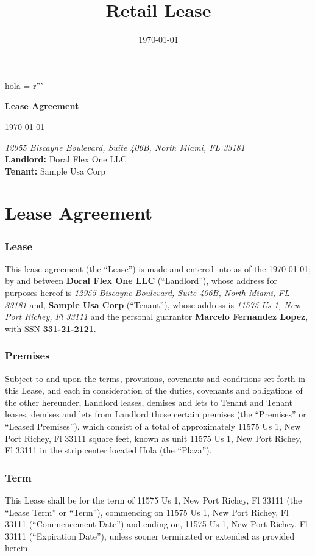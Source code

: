 hola = r'''\documentclass{article}
\title{Retail Lease}
\date{\today}
\newcommand{\docname}{Lease Agreement}
\newcommand{\company}{Doral Flex One LLC}
\newcommand{\buildingaddress}{Hola}
\newcommand{\tenant}{Sample Usa Corp}
\newcommand{\tenantaddress}{11575 Us 1, New Port Richey, Fl 33111}
\newcommand{\corpaddress}{12955 Biscayne Boulevard, Suite 406B, North Miami, FL 33181}
\newcommand{\tenantpersonalguarantor}{Marcelo Fernandez Lopez}
\newcommand{\guarantorssn}{331-21-2121}
\newcommand{\unit}{11575 Us 1, New Port Richey, Fl 33111}
\newcommand{\unitsize}{11575 Us 1, New Port Richey, Fl 33111}
\newcommand{\leaseterm}{11575 Us 1, New Port Richey, Fl 33111}
\newcommand{\commencementdate}{11575 Us 1, New Port Richey, Fl 33111}
\newcommand{\expirationdate}{11575 Us 1, New Port Richey, Fl 33111}
\begin{document}
\begin{titlepage}
    \begin{center}
        \vspace{1cm}
            
        \Huge
        \textbf{\docname}
        
        \vspace{0.5cm}
        \LARGE
        \today
            
            
        \vfill
        \textit{\corpaddress}\\
        \vspace{0.8cm}
        \Large
        \textbf{Landlord: }\company\\
        \textbf{Tenant: }\tenant\\
            
    \end{center}
\end{titlepage}
\tableofcontents
\pagebreak
\part{Lease Agreement}
\section*{Lease}
This lease agreement (the ``Lease'') is made and entered into as of the \today; by and between \textbf{\company}{} (``Landlord''), whose address for purposes hereof is \textit{\corpaddress}{} and, \textbf{\tenant}{} (``Tenant''), whose address is \textit{\tenantaddress}{}  and the personal guarantor \textbf{\tenantpersonalguarantor}{}, with SSN{} \textbf{\guarantorssn}.
\section{Premises}
    Subject to and upon the terms, provisions, covenants and conditions set forth in this Lease, and each in consideration of the duties, covenants and obligations of the other hereunder, Landlord leases, demises and lets to Tenant and Tenant leases, demises and lets from Landlord those certain premises (the ``Premises'' or ``Leased Premises''), which consist of a total of approximately \unitsize {} square feet, known as unit \unit {} in the strip center located \buildingaddress {} (the ``Plaza'').
\section{Term}
    This Lease shall be for the term of \leaseterm {} (the ``Lease Term'' or ``Term''), commencing on \commencementdate {} (``Commencement Date'') and ending on, \expirationdate {} (``Expiration Date''), unless sooner terminated or extended as provided herein.
    
\end{document}
